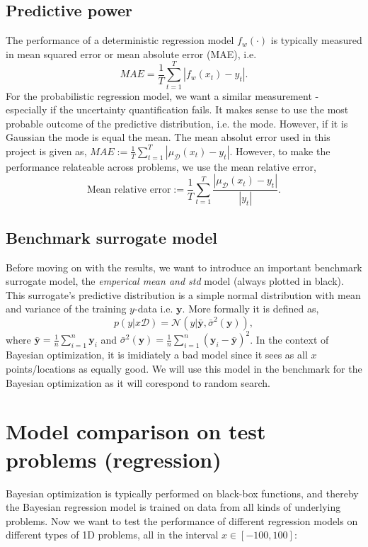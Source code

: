 \subsection{Predictive power}
The performance of a deterministic regression model $f_w(\cdot)$ is typically measured in mean squared error or 
mean absolute error (MAE), i.e. 
$$MAE = \frac{1}{T}\sum_{t=1}^T |f_{w}(x_t) - y_t|.$$ For the probabilistic regression model, we
want a similar measurement - especially if the uncertainty quantification fails. It makes sense to use
the most probable outcome of the predictive distribution, i.e. the mode. However, if it is Gaussian
the mode is equal the mean. The mean absolut error used in this project is given as, 
$MAE :=\frac{1}{T}\sum_{t=1}^T |\mu_{\mathcal{D}}(x_t) - y_t|.$ However, to make the performance
relateable across problems, we use the mean relative error, 
$$\text{Mean relative error} :=\frac{1}{T}\sum_{t=1}^T \frac{|\mu_{\mathcal{D}}(x_t) - y_t|}{|y_t|}.$$

\subsection{Benchmark surrogate model}
Before moving on with the results, we want to introduce an important benchmark surrogate model, the
\textit{emperical mean and std} model (always plotted in black). This surrogate's predictive distribution
is a simple normal distribution with mean and variance of the training $y$-data i.e. $\textbf{y}$. More
formally it is defined as, 
$$p(y|x\mathcal{D}) = \mathcal{N}(y| \bar{\textbf{y}} , \bar{\sigma}^2 (\textbf{y})),$$ where
$\bar{\textbf{y}} = \frac{1}{n}\sum_{i=1}^n \textbf{y}_i $ and $\bar{\sigma}^2 (\textbf{y}) =
\frac{1}{n}\sum_{i=1}^n (\textbf{y}_i-\bar{\textbf{y}})^2$. In the context of Bayesian optimization,
it is imidiately a bad model since it sees as all $x$ points/locations as equally good. We will use
this model in the benchmark for the Bayesian optimization as it will corespond to random search. 
 
\section{Model comparison on test problems (regression)}
Bayesian optimization is typically performed on black-box functions, and thereby the Bayesian
regression model is trained on data from all kinds of underlying problems. Now we want to test the
performance of different regression models on different types of 1D problems, all in the interval $x
\in [-100,100]$:

